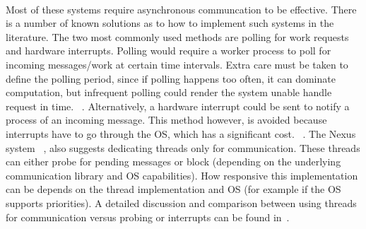 \paragraph{}
Most of these systems require asynchronous communcation to be effective.  There is a number of known solutions as 
to how to implement such systems in the literature.  The two most commonly used methods are polling for work requests
~\cite{Beckman96tulip:a, Saunders:2003:AAP:966049.781534, Foster96thenexus, vonEicken:1992:AMM:146628.140382} 
and hardware interrupts.
Polling would require a worker process to poll for incoming messages/work at certain
time intervals.   Extra care must be taken to define the polling period, since if polling happens too often, it can
dominate computation, but infrequent polling could render the system unable handle request in time. 
~\cite{Saunders:2003:AAP:966049.781534, Shah:1998:PEL:876880.879642}.
Alternatively, a hardware interrupt could be sent to notify a process of an incoming message.  This method however,
is avoided because interrupts have to go through the OS, which has a significant cost. 
~\cite{Saunders:2003:AAP:966049.781534, Shah:1998:PEL:876880.879642, Foster96thenexus, vonEicken:1992:AMM:146628.140382}.
The Nexus system ~\cite{Foster96thenexus}, also suggests dedicating threads only for communication.  These threads can 
either probe for pending messages or block (depending on the underlying communication library and OS capabilities).
How responsive this implementation can be depends on the thread implementation and OS (for example if the OS supports
priorities).  A detailed discussion and comparison between using threads for communication versus probing or interrupts
can be found in~\cite{Foster96thenexus}.


